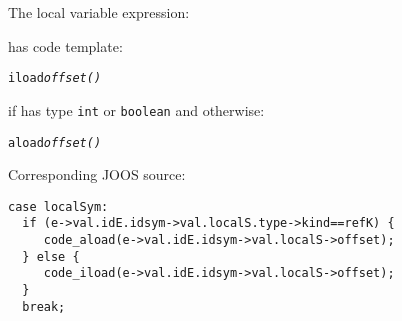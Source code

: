 \begin{slide*}
The local variable expression:
 
\begin{scriptsize}
\begin{alltt}
\end{alltt}
\end{scriptsize}
 
has code template:
 
\begin{scriptsize}
\begin{alltt}
    iload {\em offset()}
\end{alltt}
\end{scriptsize}

if  has type {\tt int} or {\tt boolean} and otherwise:

\begin{scriptsize}
\begin{alltt}
    aload {\em offset()}
\end{alltt}
\end{scriptsize}
 
Corresponding JOOS source:
 
\begin{scriptsize}
\begin{verbatim}
case localSym:
  if (e->val.idE.idsym->val.localS.type->kind==refK) {
     code_aload(e->val.idE.idsym->val.localS->offset);
  } else {
     code_iload(e->val.idE.idsym->val.localS->offset);
  }      
  break;
\end{verbatim}
\end{scriptsize}

\vfil
\end{slide*}

